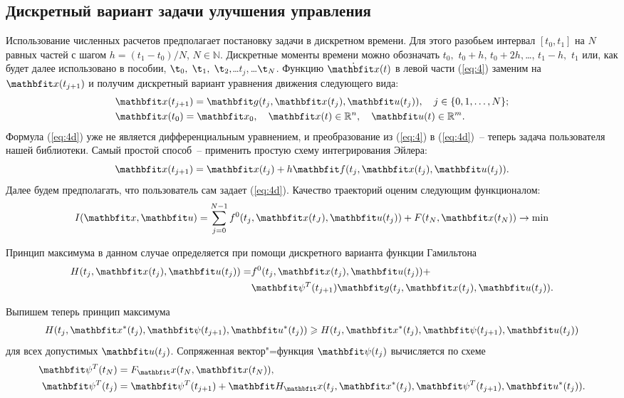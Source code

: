\documentclass[a4paper,14pt, openany, twoside, final]{extbook} %
\begin{document}
\subsection{Дискретный вариант задачи улучшения управления}
\label{sec:discrete}

Использование численных расчетов предполагает постановку задачи в дискретном времени.  Для этого разобьем интервал $[t_0,t_1]$ на $N$ равных частей с шагом $h=(t_1-t_0)/N$, $N\in\mathbb{N}$.  Дискретные моменты времени можно обозначать $t_0,$ $t_0+h$, $t_0+2h,$\ldots, $t_1-h,$ $t_1$ или, как будет далее использовано в пособии, $\t_0,$ $\t_1,$ $\t_2,$\ldots $t_j,$\ldots $\t_N$.  Функцию $\dot{\vecx}(t)$ в левой части (\ref{eq:4}) заменим на $\vecx(t_{j+1})$ и получим дискретный вариант уравнения движения следующего вида:
\begin{align}
  \label{eq:4d}
  &\vecx(t_{j+1})=\vecg(t_j,\vecx(t_j),\vecu(t_j)),\quad j\in\{0,1,\ldots,N\};\\
  \label{eq:4dcond}
  &\vecx(t_0)=\vecx_0, \quad \vecx(t)\in\mathbb{R}^n,  \quad \vecu(t)\in\mathbb{R}^m.
\end{align}
Формула (\ref{eq:4d}) уже не является дифференциальным уравнением, и преобразование из (\ref{eq:4}) в (\ref{eq:4d})~-- теперь задача пользователя нашей библиотеки.  Самый простой способ~-- применить простую схему интегрирования Эйлера:
\begin{equation}
  \label{eq:4d1} \nonumber
  \vecx(t_{j+1})=\vecx(t_j)+h\vecf(t_j,\vecx(t_j),\vecu(t_j)).
\end{equation}
Далее будем предполагать, что пользователь сам задает (\ref{eq:4d}).  Качество траекторий оценим следующим функционалом:
\begin{equation}
  I(\vecx,\vecu)=\sum_{j=0}^{N-1}f^0(t_j,\vecx(t_J),\vecu(t_j))+F(t_N,\vecx(t_N)) \to \min
    \label{eq103}
\end{equation}

Принцип максимума в данном случае определяется при помощи дискретного варианта функции Гамильтона
\begin{align}
  H(t_j,\vecx(t_j),\vecu(t_j))=&f^0(t_j,\vecx(t_j),\vecu(t_j))+\nonumber\\
   &\vecpsi^T(t_{j+1})\vecg(t_j,\vecx(t_j),\vecu(t_j)).   \label{eq:descH}
\end{align}

Выпишем теперь принцип максимума
\begin{align}
  H(t_j,\vecx^*(t_j),\vecpsi(t_{j+1}),\vecu^*(t_j))\geqslant H(t_j,\vecx^*(t_j),\vecpsi(t_{j+1}),\vecu(t_j)) \label{eq:descMax}
\end{align}
для всех допустимых $\vecu(t_j)$.  Сопряженная вектор"=функция $\vecpsi(t_j)$ вычисляется по схеме
\begin{align}
  \label{eq:startPsi}
  \vecpsi^T(t_N)&=F_\vecx(t_N,\vecx(t_N)), \nonumber\\ \vecpsi^T(t_j)&=\vecpsi^T(t_{j+1})+\vecH_\vecx(t_j,\vecx^*(t_j),\vecpsi^T(t_{j+1}),\vecu^*(t_j)).
\end{align}
\end{document}
